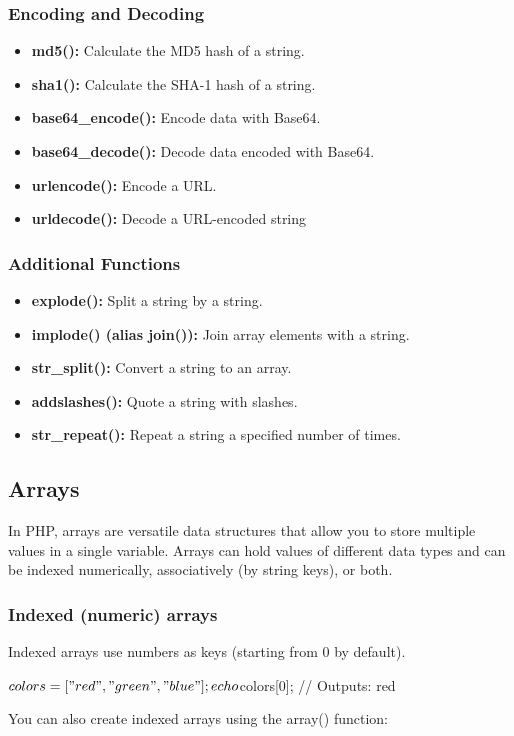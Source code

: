\documentclass{report}
\begin{document}
\bigbreak \noindent 
\subsubsection{Encoding and Decoding}
\begin{itemize}
    \item \textbf{md5():} Calculate the MD5 hash of a string.
    \item \textbf{sha1():} Calculate the SHA-1 hash of a string.
    \item \textbf{base64\_encode():} Encode data with Base64.
    \item \textbf{base64\_decode():} Decode data encoded with Base64.
    \item \textbf{urlencode():} Encode a URL.
    \item \textbf{urldecode():} Decode a URL-encoded string
\end{itemize}

\bigbreak \noindent 
\subsubsection{Additional Functions}
\begin{itemize}
    \item \textbf{explode():} Split a string by a string.
    \item \textbf{implode() (alias join()):} Join array elements with a string.
    \item \textbf{str\_split():} Convert a string to an array.
    \item \textbf{addslashes():} Quote a string with slashes.
    \item \textbf{str\_repeat():} Repeat a string a specified number of times.
\end{itemize}



\bigbreak \noindent 
\subsection{Arrays}
\bigbreak \noindent 
In PHP, arrays are versatile data structures that allow you to store multiple values in a single variable. Arrays can hold values of different data types and can be indexed numerically, associatively (by string keys), or both.
\bigbreak \noindent 
\subsubsection{Indexed (numeric) arrays}
\bigbreak \noindent 
Indexed arrays use numbers as keys (starting from 0 by default).
\bigbreak \noindent 
\begin{phpcode}
$colors = ["red", "green", "blue"];
echo $colors[0];  // Outputs: red
\end{phpcode}
\bigbreak \noindent 
You can also create indexed arrays using the array() function:
\bigbreak \noindent 
{}
\end{document}
